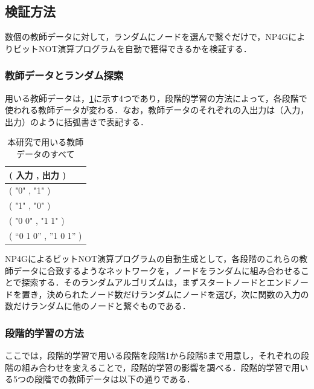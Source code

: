 \documentclass[exploratorypaper]{jsaiart} %
\begin{document}
\subsection{検証方法}
数個の教師データに対して，ランダムにノードを選んで繋ぐだけで，NP4GによりビットNOT演算プログラムを自動で獲得できるかを検証する．

\subsubsection{教師データとランダム探索}
用いる教師データは，\ref{tbl:TeacherData}に示す4つであり，段階的学習の方法によって，各段階で使われる教師データが変わる．なお，教師データのそれぞれの入出力は（入力，出力）のように括弧書きで表記する．

\begin{table}[htbp]
\centering
\caption{本研究で用いる教師データのすべて}
\label{tbl:TeacherData}
\begin{tabular}{l}
    \hline
     ( 入力 , 出力 ) \\
    \hline \hline
    ( "0" , "1" ) \\
    ( "1" , "0" ) \\
    ( "0 0" , "1 1" ) \\
    ( “0 1 0” , ”1 0 1” ) \\
    \hline
\end{tabular}
\end{table}

NP4GによるビットNOT演算プログラムの自動生成として，各段階のこれらの教師データに合致するようなネットワークを，ノードをランダムに組み合わせることで探索する．そのランダムアルゴリズムは，まずスタートノードとエンドノードを置き，決められたノード数だけランダムにノードを選び，次に関数の入力の数だけランダムに他のノードと繋ぐものである．

\subsubsection{段階的学習の方法}
\label{sec:PLhow}
ここでは，段階的学習で用いる段階を段階1から段階5まで用意し，それぞれの段階の組み合わせを変えることで，段階的学習の影響を調べる．段階的学習で用いる5つの段階での教師データは以下の通りである．

\end{document}
